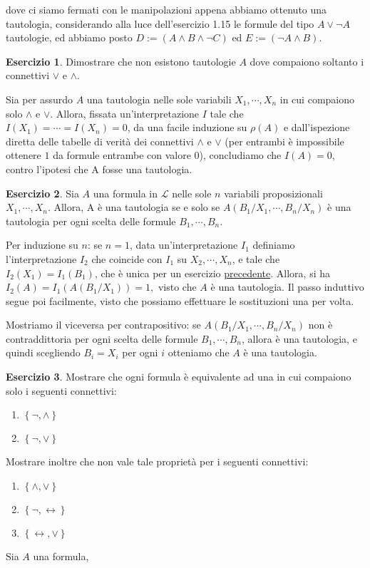 \documentclass[a4paper]{article}
\newcommand{\liff}{\leftrightarrow}
\theoremstyle{definition}
\theoremstyle{definition}
\theoremstyle{remark}
\theoremstyle{definition}
\newtheorem{exercise}{Esercizio}[section]
\begin{document}
dove ci siamo fermati con le manipolazioni appena abbiamo ottenuto una tautologia, considerando alla luce dell'esercizio 1.15 le formule del tipo $A\lor\lnot A$ tautologie, ed abbiamo posto $D:=\left( A\land B\land\lnot C \right) $ ed $E:=\left( \lnot A\land B \right) $.
\begin{exercise}
	 Dimostrare che non esistono tautologie $A$ dove compaiono soltanto i connettivi $\lor$ e $\land$.
\end{exercise}
Sia per assurdo $A$ una tautologia nelle sole variabili $X_1,\cdots,X_n$ in cui compaiono solo $\land$ e $\lor$.
Allora, fissata un'interpretazione $I$ tale che $I( X_1 )
=\cdots=I(X_n )=0$, da una facile induzione su $\rho(A)$ e dall'ispezione diretta delle tabelle di verità dei connettivi $\land$ e $\lor$ (per entrambi è impossibile ottenere $1$
da formule entrambe con valore $0$), concludiamo che $I( A ) =0$, contro l'ipotesi che A fosse una
tautologia.
\setcounter{exercise}{18}
\begin{exercise}
	Sia $A$ una formula in $\mathcal{L}$ nelle sole $n$ variabili proposizionali $X_1,\cdots,X_n $. Allora, A è una tautologia se e solo se $A\left( B_1\slash X_1,\cdots, B_n\slash X_n \right) $ è una
	tautologia per ogni scelta delle formule $B_1,\cdots,B_n$.
\end{exercise}
Per induzione su $n$: se $n=1$, data un'interpretazione $I_1$ definiamo l'interpretazione $I_2$ che coincide con $I_1$ su $X_2,\cdots,X_n$, e tale che
$I_2(X_1)=I_1(B_1)$, che è
unica per un esercizio \hyperref[unicità]{precedente}. Allora, si ha
$I_2(A)=I_1(A(B_1\slash X_1))=1,$ visto che $A$ è una tautologia.
Il passo induttivo segue poi facilmente, visto che possiamo effettuare le sostituzioni una per volta.

Mostriamo il viceversa per contrapositivo: se $A\left( B_1\slash X_1,\cdots, B_n\slash X_n \right)$ non è
contraddittoria per ogni scelta delle formule $B_1,\cdots,B_n$, allora è una tautologia, e quindi scegliendo $B_i=X_i$ per ogni $i$ otteniamo che $A$ è una tautologia.
\setcounter{exercise}{28}
\begin{exercise}
	Mostrare che ogni formula è equivalente ad una in cui compaiono solo i seguenti connettivi:
	\begin{enumerate}
		\item $\left\{ \lnot,\land \right\}$
		\item $\left\{ \lnot,\lor \right\}$
	\end{enumerate}
	Mostrare inoltre che non vale tale proprietà per i seguenti connettivi:
	\begin{enumerate}
		\item $\left\{ \land,\lor \right\}$
		\item $\left\{ \lnot,\liff \right\}$
		\item $\left\{ \liff,\lor \right\}$
	\end{enumerate}
\end{exercise}
\noindent
Sia $A$ una formula,
\end{document}
